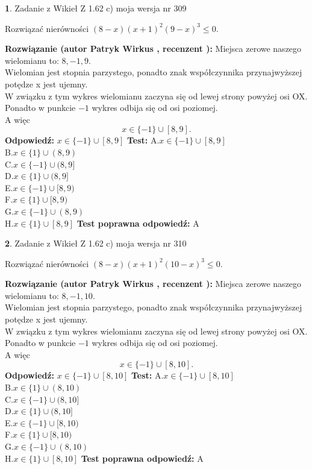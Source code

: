 \documentclass[12pt, a4paper]{article}
\theoremstyle{definition} %
\newtheorem{zad}{}
\newcommand{\zadStart}[1]{\begin{zad}#1\newline}
\newcommand{\zadStop}{\end{zad}}
\newcommand{\rozwStart}[2]{\noindent \textbf{Rozwiązanie (autor #1 , recenzent #2): }\newline}
\newcommand{\rozwStop}{\newline}
\newcommand{\odpStart}{\noindent \textbf{Odpowiedź:}\newline}
\newcommand{\odpStop}{\newline}
\newcommand{\testStart}{\noindent \textbf{Test:}\newline}
\newcommand{\testStop}{\newline}
\newcommand{\kluczStart}{\noindent \textbf{Test poprawna odpowiedź:}\newline}
\newcommand{\kluczStop}{\newline}
\begin{document}
\zadStart{Zadanie z Wikieł Z 1.62 c) moja wersja nr 309}

Rozwiązać nierówności $(8-x)(x+1)^{2}(9-x)^{3}\le0$.
\zadStop
\rozwStart{Patryk Wirkus}{}
Miejsca zerowe naszego wielomianu to: $8, -1, 9$.\\
Wielomian jest stopnia parzystego, ponadto znak współczynnika przy\linebreak najwyższej potędze x jest ujemny.\\ W związku z tym wykres wielomianu zaczyna się od lewej strony powyżej osi OX.\\
Ponadto w punkcie $-1$ wykres odbija się od osi poziomej.\\
A więc $$x \in \{-1\} \cup [8,9].$$
\rozwStop
\odpStart
$x \in \{-1\} \cup [8,9]$
\odpStop
\testStart
A.$x \in \{-1\} \cup [8,9]$\\
B.$x \in \{1\} \cup (8,9)$\\
C.$x \in \{-1\} \cup (8,9]$\\
D.$x \in \{1\} \cup (8,9]$\\
E.$x \in \{-1\} \cup [8,9)$\\
F.$x \in \{1\} \cup [8,9)$\\
G.$x \in \{-1\} \cup (8,9)$\\
H.$x \in \{1\} \cup [8,9]$
\testStop
\kluczStart
A
\kluczStop



\zadStart{Zadanie z Wikieł Z 1.62 c) moja wersja nr 310}

Rozwiązać nierówności $(8-x)(x+1)^{2}(10-x)^{3}\le0$.
\zadStop
\rozwStart{Patryk Wirkus}{}
Miejsca zerowe naszego wielomianu to: $8, -1, 10$.\\
Wielomian jest stopnia parzystego, ponadto znak współczynnika przy\linebreak najwyższej potędze x jest ujemny.\\ W związku z tym wykres wielomianu zaczyna się od lewej strony powyżej osi OX.\\
Ponadto w punkcie $-1$ wykres odbija się od osi poziomej.\\
A więc $$x \in \{-1\} \cup [8,10].$$
\rozwStop
\odpStart
$x \in \{-1\} \cup [8,10]$
\odpStop
\testStart
A.$x \in \{-1\} \cup [8,10]$\\
B.$x \in \{1\} \cup (8,10)$\\
C.$x \in \{-1\} \cup (8,10]$\\
D.$x \in \{1\} \cup (8,10]$\\
E.$x \in \{-1\} \cup [8,10)$\\
F.$x \in \{1\} \cup [8,10)$\\
G.$x \in \{-1\} \cup (8,10)$\\
H.$x \in \{1\} \cup [8,10]$
\testStop
\kluczStart
A
\kluczStop
\end{document}
